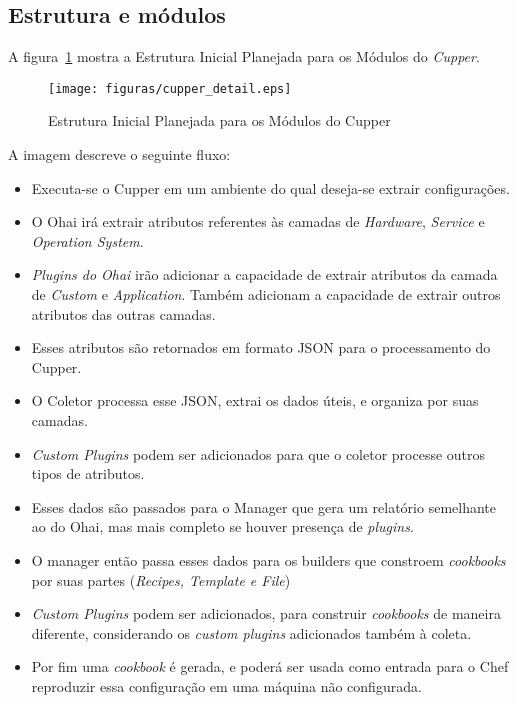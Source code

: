 \subsection{Estrutura e módulos}

A figura~\ref{fig:cupper-detail} mostra a Estrutura Inicial Planejada para os 
Módulos do \textit{Cupper}.

\begin{figure}[H]
  \centering
  \texttt{[image: figuras/cupper\_detail.eps]}
  \caption{Estrutura Inicial Planejada para os Módulos do Cupper}
  \label{fig:cupper-detail}
\end{figure}

A imagem descreve o seguinte fluxo:

\begin{itemize}
    \item Executa-se o Cupper em um ambiente do qual deseja-se extrair configurações.
    \item O Ohai irá extrair atributos referentes às camadas de \textit{Hardware},
\textit{Service} e \textit{Operation System}.
    \item \textit{Plugins do Ohai} irão adicionar a capacidade de extrair atributos da
camada de \textit{Custom} e \textit{Application}. Também adicionam a capacidade
de extrair outros atributos das outras camadas.
    \item Esses atributos são retornados em formato JSON para o processamento
do Cupper.
    \item O Coletor processa esse JSON, extrai os dados úteis, e organiza
por suas camadas.
    \item \textit{Custom Plugins} podem ser adicionados para que o coletor
processe outros tipos de atributos.
    \item Esses dados são passados para o Manager que gera um relatório semelhante
ao do Ohai, mas mais completo se houver presença de \textit{plugins}.
    \item O manager então passa esses dados para os builders que constroem
\textit{cookbooks} por suas partes (\textit{Recipes, Template e File})
    \item \textit{Custom Plugins} podem ser adicionados, para construir
\textit{cookbooks} de maneira diferente, considerando os \textit{custom plugins}
adicionados também à coleta.
    \item Por fim uma \textit{cookbook} é gerada, e poderá ser usada como 
entrada para o Chef reproduzir essa configuração em uma máquina não
configurada.
\end{itemize}
